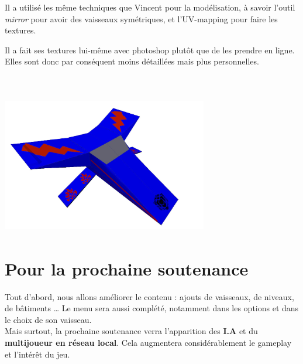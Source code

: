 \documentclass[10pt, titlepage]{report}
\begin{document}
Il a utilisé les même techniques que Vincent pour la modélisation, à savoir l'outil \textit{mirror} pour avoir des vaisseaux symétriques, et  l'UV-mapping pour faire les textures.

Il a fait ses textures lui-même avec photoshop plutôt que de les prendre en ligne. Elles sont donc par conséquent moins détaillées mais plus personnelles.\\ \\ \\

\begin{center}
\includegraphics[height=6cm, width=9cm]{vaisseau arthur.jpg}\\
\end{center}


\chapter{Pour la prochaine soutenance}

Tout d'abord, nous allons améliorer le contenu : ajouts de vaisseaux, de niveaux, de bâtiments \dots
Le menu sera aussi complété, notamment dans les options et dans le choix de son vaisseau.\\

Mais surtout, la prochaine soutenance verra l'apparition des \textbf{I.A} et du \textbf{multijoueur en réseau local}. Cela augmentera considérablement le gameplay et l'intérêt du jeu.
\end{document}
